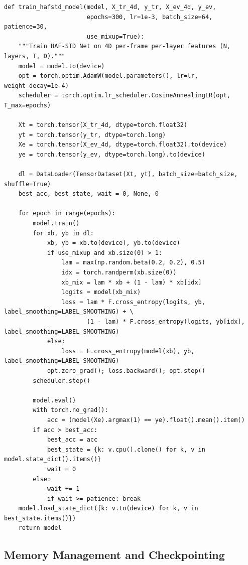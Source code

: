 \begin{lstlisting}[caption={4D Tensor Mixup and Training Harness for HAF-STD Net on HMDB51.}, label={lst:hafstd_train_impl}]
def train_hafstd_model(model, X_tr_4d, y_tr, X_ev_4d, y_ev,
                       epochs=300, lr=1e-3, batch_size=64, patience=30,
                       use_mixup=True):
    """Train HAF-STD Net on 4D per-frame per-layer features (N, layers, T, D)."""
    model = model.to(device)
    opt = torch.optim.AdamW(model.parameters(), lr=lr, weight_decay=1e-4)
    scheduler = torch.optim.lr_scheduler.CosineAnnealingLR(opt, T_max=epochs)

    Xt = torch.tensor(X_tr_4d, dtype=torch.float32)
    yt = torch.tensor(y_tr, dtype=torch.long)
    Xe = torch.tensor(X_ev_4d, dtype=torch.float32).to(device)
    ye = torch.tensor(y_ev, dtype=torch.long).to(device)

    dl = DataLoader(TensorDataset(Xt, yt), batch_size=batch_size, shuffle=True)
    best_acc, best_state, wait = 0, None, 0

    for epoch in range(epochs):
        model.train()
        for xb, yb in dl:
            xb, yb = xb.to(device), yb.to(device)
            if use_mixup and xb.size(0) > 1:
                lam = max(np.random.beta(0.2, 0.2), 0.5)
                idx = torch.randperm(xb.size(0))
                xb_mix = lam * xb + (1 - lam) * xb[idx]
                logits = model(xb_mix)
                loss = lam * F.cross_entropy(logits, yb, label_smoothing=LABEL_SMOOTHING) + \
                       (1 - lam) * F.cross_entropy(logits, yb[idx], label_smoothing=LABEL_SMOOTHING)
            else:
                loss = F.cross_entropy(model(xb), yb, label_smoothing=LABEL_SMOOTHING)
            opt.zero_grad(); loss.backward(); opt.step()
        scheduler.step()

        model.eval()
        with torch.no_grad():
            acc = (model(Xe).argmax(1) == ye).float().mean().item()
        if acc > best_acc:
            best_acc = acc
            best_state = {k: v.cpu().clone() for k, v in model.state_dict().items()}
            wait = 0
        else:
            wait += 1
            if wait >= patience: break
    model.load_state_dict({k: v.to(device) for k, v in best_state.items()})
    return model
\end{lstlisting}

\subsection{Memory Management and Checkpointing}

